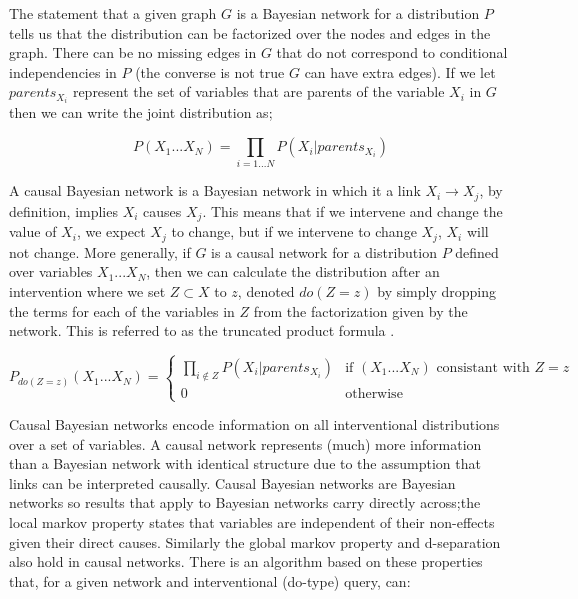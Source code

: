 \documentclass[11pt,a4paper]{article}
\begin{document}
The statement that a given graph $G$ is a Bayesian network for a distribution $P$ tells us that the distribution can be factorized over the nodes and edges in the graph. There can be no missing edges in $G$ that do not correspond to conditional independencies in $P$ (the converse is not true $G$ can have extra edges). If we let $parents_{X_{i}}$ represent the set of variables that are parents of the variable $X_{i}$ in $G$ then we can write the joint distribution as; 

\begin{equation}
P(X_{1}...X_{N}) = \prod_{i = 1...N}P(X_{i}|parents_{X_{i}})
\end{equation}

A causal Bayesian network is a Bayesian network in which it a link $X_{i} \rightarrow X_{j}$, by definition, implies $X_{i}$ causes $X_{j}$. This means that if we intervene and change the value of $X_{i}$, we expect $X_{j}$ to change, but if we intervene to change $X_{j}$, $X_{i}$ will not change. More generally, if $G$ is a causal network for a distribution $P$ defined over variables $X_{1}...X_{N}$, then we can calculate the distribution after an intervention where we set $Z \subset X$ to $z$, denoted $do(Z=z)$ by simply dropping the terms for each of the variables in $Z$ from the factorization given by the network. This is referred to as the truncated product formula \cite{Pearl2000}.

\begin{equation}
\label{eq:truncatedproduct}
 P_{do(Z=z)}(X_{1}...X_{N}) =
  \begin{cases}
  \prod_{i \notin Z}P(X_{i}|parents_{X_{i}}) & \text{if $(X_{1}...X_{N})$ consistant with $Z=z$}  \\
   0       & \text{otherwise } 
  \end{cases}
\end{equation}


Causal Bayesian networks encode information on all interventional distributions over a set of variables. A causal network represents (much) more information than a Bayesian network with identical structure due to the assumption that links can be interpreted causally. Causal Bayesian networks are Bayesian networks so results that apply to Bayesian networks carry directly across;the local markov property states that variables are independent of their non-effects given their direct causes. Similarly the global markov property and d-separation also hold in causal networks. There is an algorithm \cite{Shpitser2012} based on these properties that, for a given network and interventional (do-type) query, can:
\end{document}
